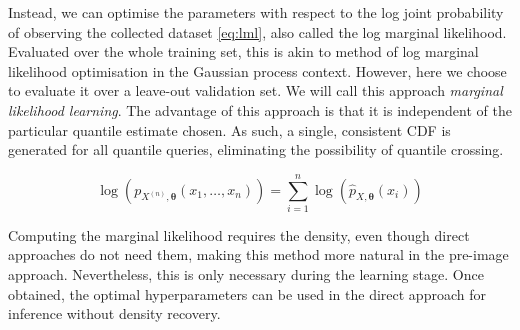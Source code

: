 \documentclass[twoside]{article} \usepackage{aistats2017}
\theoremstyle{definition}
\theoremstyle{theorem}
\newcommand{\rv}[1]{{#1}}
\begin{document}
	Instead, we can optimise the parameters with respect to the log joint probability of observing the collected dataset \eqref{eq:lml}, also called the log marginal likelihood. Evaluated over the whole training set, this is akin to method of log marginal likelihood optimisation in the Gaussian process context. However, here we choose to evaluate it over a leave-out validation set. We will call this approach \textit{marginal likelihood learning}. The advantage of this approach is that it is independent of the particular quantile estimate chosen. As such, a single, consistent CDF is generated for all quantile queries, eliminating the possibility of quantile crossing. 
	
	\begin{equation}
		\log(p_{\rv{X}^{(n)}, \bm{\theta}}(x_{1}, \dots, x_{n}))= \sum_{i = 1}^{n} \log(\hat{p}_{\rv{X}, \bm{\theta}}(x_{i}))
	\label{eq:lml}
	\end{equation}
	
	Computing the marginal likelihood requires the density, even though direct approaches do not need them, making this method more natural in the pre-image approach. Nevertheless, this is only necessary during the learning stage. Once obtained, the optimal hyperparameters can be used in the direct approach for inference without density recovery.
	
\end{document}
